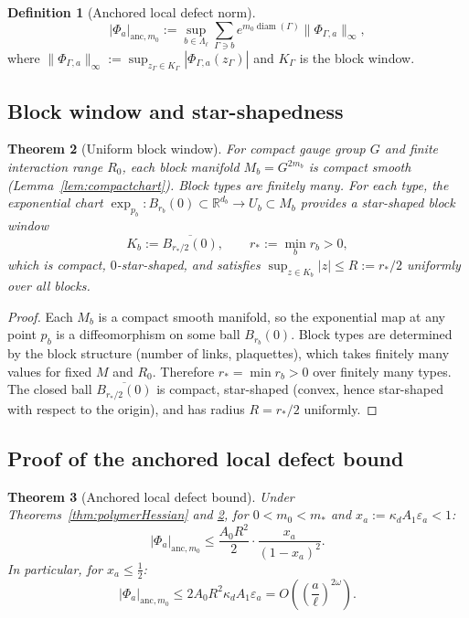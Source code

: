 \documentclass[12pt]{article}
\theoremstyle{plain}
\newtheorem{theorem}{Theorem}[section]
\theoremstyle{definition}
\newtheorem{definition}[theorem]{Definition}
\numberwithin{equation}{section}
\newcommand{\R}{\mathbb{R}}
\newcommand{\diam}{\operatorname{diam}}
\begin{document}
\begin{definition}[Anchored local defect norm]
\begin{equation}
|\Phi_a|_{\mathrm{anc},m_0} := \sup_{b\in\Lambda_\ell}\sum_{\Gamma\ni b}e^{m_0\diam(\Gamma)}\|\Phi_{\Gamma,a}\|_\infty,
\end{equation}
where $\|\Phi_{\Gamma,a}\|_\infty:=\sup_{z_\Gamma\in K_\Gamma}|\Phi_{\Gamma,a}(z_\Gamma)|$ and $K_\Gamma$ is the block window.
\end{definition}

\subsection{Block window and star-shapedness}

\begin{theorem}[Uniform block window]\label{thm:blockwindow}
For compact gauge group $G$ and finite interaction range $R_0$, each block manifold $M_b=G^{2m_b}$ is compact smooth (Lemma~\ref{lem:compactchart}).  Block types are finitely many.  For each type, the exponential chart $\exp_{p_b}:B_{r_b}(0)\subset\R^{d_b}\to U_b\subset M_b$ provides a star-shaped block window
\begin{equation}
K_b := \overline{B_{r_*/2}(0)},\qquad r_*:=\min_b r_b>0,
\end{equation}
which is compact, $0$-star-shaped, and satisfies $\sup_{z\in K_b}|z|\leq R:=r_*/2$ uniformly over all blocks.
\end{theorem}

\begin{proof}
Each $M_b$ is a compact smooth manifold, so the exponential map at any point $p_b$ is a diffeomorphism on some ball $B_{r_b}(0)$.  Block types are determined by the block structure (number of links, plaquettes), which takes finitely many values for fixed $M$ and $R_0$.  Therefore $r_*=\min r_b>0$ over finitely many types.  The closed ball $\overline{B_{r_*/2}(0)}$ is compact, star-shaped (convex, hence star-shaped with respect to the origin), and has radius $R=r_*/2$ uniformly.
\end{proof}

\subsection{Proof of the anchored local defect bound}

\begin{theorem}[Anchored local defect bound]\label{thm:LD}
Under Theorems~\ref{thm:polymerHessian} and \ref{thm:blockwindow}, for $0<m_0<m_*$ and $x_a:=\kappa_d A_1\varepsilon_a<1$:
\begin{equation}
|\Phi_a|_{\mathrm{anc},m_0} \leq \frac{A_0R^2}{2}\cdot\frac{x_a}{(1-x_a)^2}.
\end{equation}
In particular, for $x_a\leq\frac{1}{2}$:
\begin{equation}
\boxed{|\Phi_a|_{\mathrm{anc},m_0} \leq 2A_0R^2\kappa_d A_1\varepsilon_a = O\!\left(\left(\frac{a}{\ell}\right)^{2\omega}\right).}
\end{equation}
\end{theorem}
\end{document}
